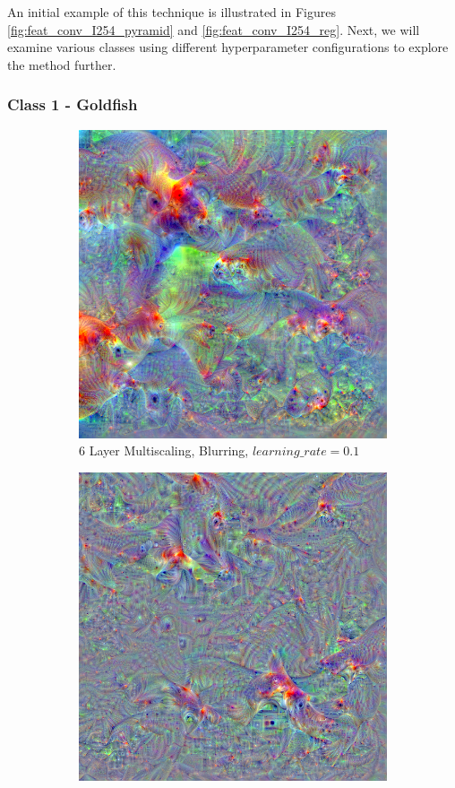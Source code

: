 An initial example of this technique is illustrated in Figures \ref{fig:feat_conv_I254_pyramid} and \ref{fig:feat_conv_I254_reg}. 
Next, we will examine various classes using different hyperparameter configurations to explore the method further.

\subsubsection{Class 1 - Goldfish}

\begin{figure}
    \captionsetup{justification=centering}

    \begin{subfigure}[t]{0.31\textwidth}
        \captionsetup{justification=centering}
        \centering
        \includegraphics[width=.7\linewidth]{figuras/feat_vis/experiments/classes/cl1/random_image_ci1_lr1e-1_pl6.png}
        \caption{6 Layer Multiscaling, Blurring, \(learning\_rate = 0.1\)}
    \end{subfigure}
    \hfill
    \begin{subfigure}[t]{0.31\textwidth}
        \captionsetup{justification=centering}
        \centering
        \includegraphics[width=.7\linewidth]{figuras/feat_vis/experiments/classes/cl1/random_image_ci1_lr4e-2_pl4_no-blur.png}

\end{subfigure}
\end{figure}
